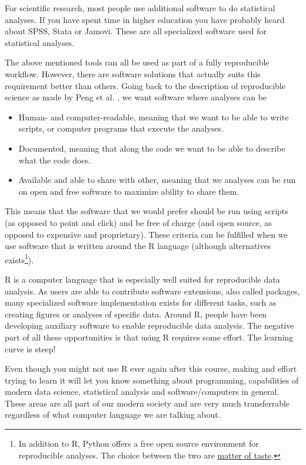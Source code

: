 \documentclass[
  11pt,
]{krantz}
\providecommand{\tightlist}{%
  \setlength{\itemsep}{0pt}\setlength{\parskip}{0pt}}
\begin{document}
For scientific research, most people use additional software to do statistical analyses. If you have spent time in higher education you have probably heard about SPSS, Stata or Jamovi. These are all specialized software used for statistical analyses.

The above mentioned tools can all be used as part of a fully reproducible workflow. However, there are software solutions that actually suits this requirement better than others. Going back to the description of reproducible science as made by Peng et al. \citep{RN1492}, we want software where analyses can be

\begin{itemize}
\tightlist
\item
  Human- and computer-readable, meaning that we want to be able to write scripts, or computer programs that execute the analyses.
\item
  Documented, meaning that along the code we want to be able to describe what the code does.
\item
  Available and able to share with other, meaning that we analyses can be run on open and free software to maximize ability to share them.
\end{itemize}

This means that the software that we would prefer should be run using scripts (as opposed to point and click) and be free of charge (and open source, as opposed to expensive and proprietary). These criteria can be fulfilled when we use software that is written around the R language (although alternatives exists\footnote{In addition to R, Python offers a free open source environment for reproducible analyses. The choice between the two are \href{https://www.datacamp.com/community/tutorials/r-or-python-for-data-analysis}{matter of taste}.}).

R is a computer language that is especially well suited for reproducible data analysis. As users are able to contribute software extensions, also called packages, many specialized software implementation exists for different tasks, such as creating figures or analyses of specific data. Around R, people have been developing auxiliary software to enable reproducible data analysis. The negative part of all these opportunities is that using R requires some effort. The learning curve is steep!

Even though you might not use R ever again after this course, making and effort trying to learn it will let you know something about programming, capabilities of modern data science, statistical analysis and software/computers in general. These areas are all part of our modern society and are very much transferrable regardless of what computer language we are talking about.
\end{document}
